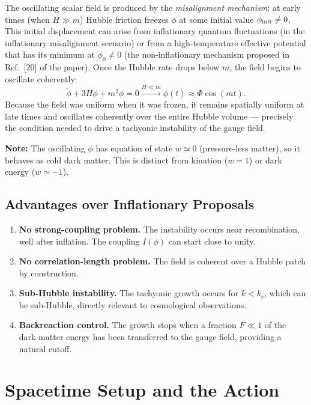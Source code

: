 \documentclass[12pt,a4paper,openany]{book}
\newcommand{\kc}{k_c}
\begin{document}
The oscillating scalar field is produced by the \emph{misalignment mechanism}: at early times (when $H \gg m$) Hubble friction freezes $\phi$ at some initial value $\phi_{\rm init} \neq 0$. This initial displacement can arise from inflationary quantum fluctuations (in the inflationary misalignment scenario) or from a high-temperature effective potential that has its minimum at $\phi_0 \neq 0$ (the non-inflationary mechanism proposed in Ref.~[20] of the paper). Once the Hubble rate drops below $m$, the field begins to oscillate coherently:
\begin{equation}
  \ddot\phi + 3H\dot\phi + m^2\phi = 0 \xrightarrow{H\ll m} \phi(t)\approx \Phi\cos(mt).
\end{equation}
Because the field was uniform when it was frozen, it remains spatially uniform at late times and oscillates coherently over the entire Hubble volume — precisely the condition needed to drive a tachyonic instability of the gauge field.

\medskip
\noindent\textbf{Note:} The oscillating $\phi$ has equation of state $w \simeq 0$ (pressure-less matter), so it behaves as cold dark matter. This is distinct from kination ($w=1$) or dark energy ($w\simeq-1$).

\section{Advantages over Inflationary Proposals}
\begin{enumerate}
  \item \textbf{No strong-coupling problem.} The instability occurs near recombination, well after inflation. The coupling $I(\phi)$ can start close to unity.
  \item \textbf{No correlation-length problem.} The field is coherent over a Hubble patch by construction.
  \item \textbf{Sub-Hubble instability.} The tachyonic growth occurs for $k < \kc$, which can be sub-Hubble, directly relevant to cosmological observations.
  \item \textbf{Backreaction control.} The growth stops when a fraction $F \ll 1$ of the dark-matter energy has been transferred to the gauge field, providing a natural cutoff.
\end{enumerate}

\chapter{Spacetime Setup and the Action}
\end{document}
